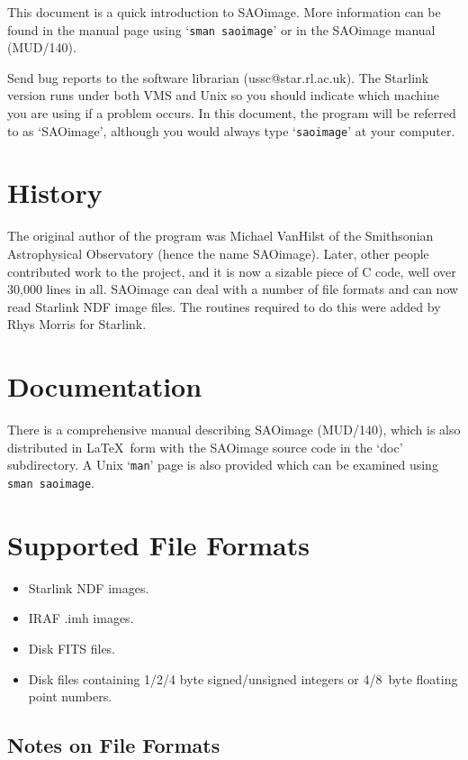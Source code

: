 This document is a quick introduction to SAOimage. More
information can be found in the manual page using `{\tt sman saoimage}'
or in the SAOimage manual (MUD/140).

Send bug reports to the software librarian (ussc@star.rl.ac.uk).
The Starlink version runs under both VMS and
Unix so you should indicate which machine you are using if a problem
occurs.  In this document, the program will be referred to as
`SAOimage', although you would always type `{\tt saoimage}' at your
computer.

\section{History}

The original author of the program was Michael VanHilst of the
Smithsonian Astrophysical Observatory (hence the name
SAOimage). Later, other people contributed work to the project, and it
is now a sizable piece of C code, well over 30,000 lines in
all. SAOimage can deal with a number of file formats and can now read
Starlink NDF image files. The routines required to do this were added
by Rhys Morris for Starlink.

\section{Documentation} 

There is a comprehensive manual describing SAOimage (MUD/140),
which is also distributed in \LaTeX\ form with the SAOimage source
code in the `doc' subdirectory. A Unix `{\tt man}' page is also provided
which can be examined using {\tt sman saoimage}.

\section{Supported File Formats}

\begin{itemize} 
\item{Starlink NDF images.}
\item{IRAF .imh images.} 
\item{Disk FITS files.} 
\item{Disk files containing 1/2/4 byte signed/unsigned integers or 4/8~byte 
floating point numbers.} 
\end {itemize}

\subsection{Notes on File Formats} 

